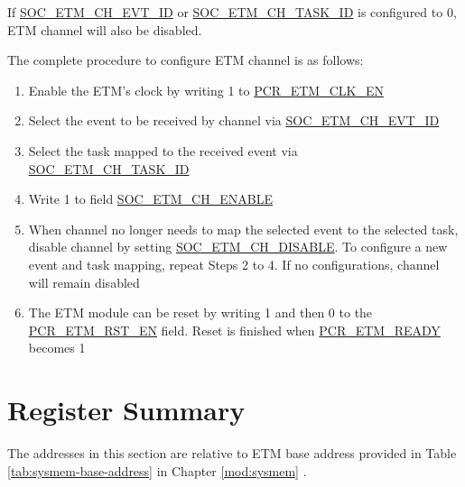 \documentclass[main\_\_EN.tex]{subfiles}
\begin{document}
If \hyperref[fielddesc:SOCETMCH0EVTID]{SOC\_ETM\_CH\_EVT\_ID}  or  \hyperref[fielddesc:SOCETMCH0TASKID]{SOC\_ETM\_CH\_TASK\_ID} is configured to 0, ETM channel will also be disabled.

The complete procedure to configure ETM channel is as follows:
\begin{enumerate}
    \item Enable the ETM's clock by writing 1 to \hyperref[fielddesc:PCRETMCLKEN]{PCR\_ETM\_CLK\_EN}
    \item Select the event to be received by channel via \hyperref[fielddesc:SOCETMCH0EVTID]{SOC\_ETM\_CH\_EVT\_ID}
    \item Select the task mapped to the received event via  \hyperref[fielddesc:SOCETMCH0TASKID]{SOC\_ETM\_CH\_TASK\_ID}
    \item Write 1 to field \hyperref[fielddesc:SOCETMCHENABLE0]{SOC\_ETM\_CH\_ENABLE}
    \item When channel no longer needs to map the selected event to the selected task, disable channel by setting \hyperref[fielddesc:SOCETMCHDISABLE0]{SOC\_ETM\_CH\_DISABLE}. To configure a new event and task mapping, repeat Steps 2 to 4. If no configurations, channel will remain disabled
    \item The ETM module can be reset by writing 1 and then 0 to the \hyperref[fielddesc:PCRETMRSTEN]{PCR\_ETM\_RST\_EN} field. Reset is finished when \hyperref[fielddesc:PCRETMREADY]{PCR\_ETM\_READY} becomes 1
\end{enumerate}





\clearpage
\hypertarget{evntaskmatrix-reg-summ}{}
\section{Register Summary}
\label{sec:evntaskmatrix-reg-summ}

The addresses in this section are relative to ETM base address provided in Table \ref{tab:sysmem-base-address} in Chapter \ref{mod:sysmem} \textit{}.
\end{document}
